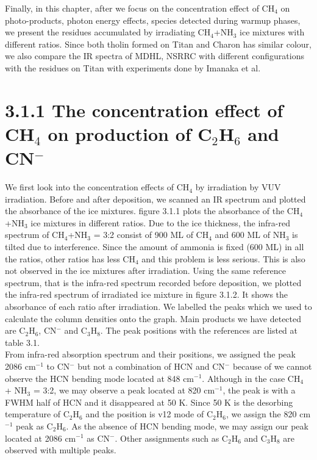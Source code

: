 Finally, in this chapter, after we focus on the concentration effect of CH$_4$ on photo-products, photon energy effects, species detected during warmup phases, we present the residues accumulated by irradiating CH$_4$+NH$_3$ ice mixtures with different ratios. Since both tholin formed on Titan and Charon has similar colour, we also compare the IR spectra of MDHL, NSRRC with different configurations with the residues on Titan with experiments done by Imanaka et al.\\
\section{3.1.1 The concentration effect of CH$_4$ on production of C$_2$H$_6$ and CN$^-$}
We first look into the concentration effects of CH$_4$ by irradiation by VUV irradiation. Before and after deposition, we scanned an IR spectrum and plotted the absorbance of the ice mixtures. figure 3.1.1 plots the absorbance of the CH$_4$+NH$_3$ ice mixtures in different ratios. Due to the ice thickness, the infra-red spectrum of CH$_4$+NH$_3$ = 3:2 consist of 900 ML of CH$_4$ and 600 ML of NH$_3$ is tilted due to interference. Since the amount of ammonia is fixed (600 ML) in all the ratios, other ratios has less CH$_4$ and this problem is less serious. This is also not observed in the ice mixtures after irradiation. Using the same reference spectrum, that is the infra-red spectrum recorded before deposition, we plotted the infra-red spectrum of irradiated ice mixture in figure 3.1.2. It shows the absorbance of each ratio after irradiation. We labelled the peaks which we used to calculate the column densities onto the graph. Main products we have detected are C$_2$H$_6$, CN$^-$ and C$_3$H$_8$. The peak positions with the references are listed at table 3.1.\\
From infra-red absorption spectrum and their positions, we assigned the peak 2086 cm$^{-1}$ to CN$^-$  but not a combination of HCN and CN$^-$ because of we cannot observe the HCN bending mode located at 848 cm$^{-1}$. Although in the case CH$_4$ + NH$_3$ = 3:2, we may observe a peak located at 820 cm$^{-1}$, the peak is with a FWHM half of HCN and it disappeared at 50 K. Since 50 K is the desorbing temperature of C$_2$H$_6$ and the position is v12 mode of C$_2$H$_6$, we assign the 820 cm$^{-1}$ peak as C$_2$H$_6$. As the absence of HCN bending mode, we may assign our peak located at 2086 cm$^{-1}$ as CN$^-$. Other assignments such as C$_2$H$_6$ and C$_3$H$_8$ are observed with multiple peaks.\\
